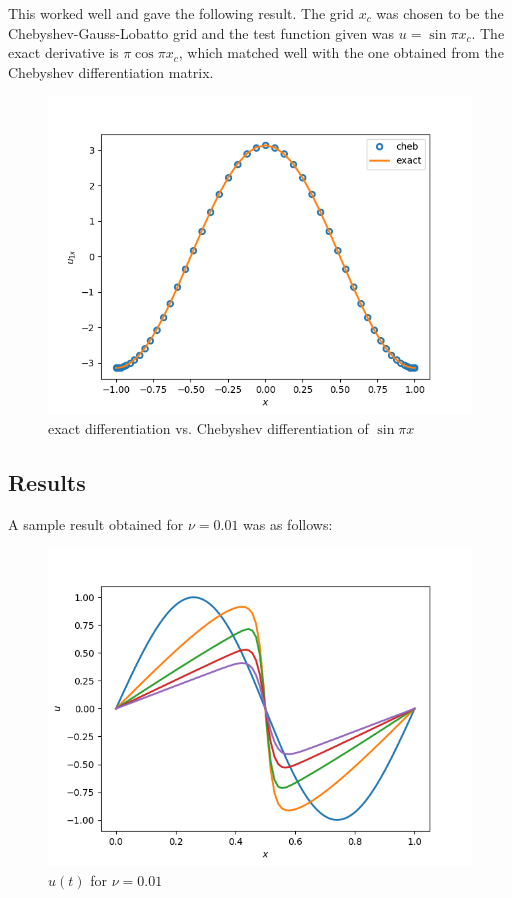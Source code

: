 \documentclass{article}
\begin{document}
This worked well and gave the following result. The grid $x_{c}$ was chosen to be the Chebyshev-Gauss-Lobatto grid and the test function given was $u = \sin{\pi x_{c}}$. The exact derivative is $\pi \cos{\pi x_{c}}$, which matched well with the one obtained from the Chebyshev differentiation matrix.   
  \begin{figure}[H]
        \centering
        \includegraphics[scale = 0.6]{Figs/test_cheb.png}
            \caption{exact differentiation vs. Chebyshev differentiation of $\sin{\pi x}$}
        \label{fig:test_interpolate_1_c2f}
\end{figure}

\subsection{Results}
A sample result obtained for $\nu = 0.01$ was as follows:
  \begin{figure}[H]
        \centering
        \includegraphics[scale = 0.6]{Figs/ut_cheb.png}
            \caption{$u(t)$ for $\nu = 0.01$}
        \label{fig:ut_fourier_nu_0_01}
\end{figure}
\end{document}
